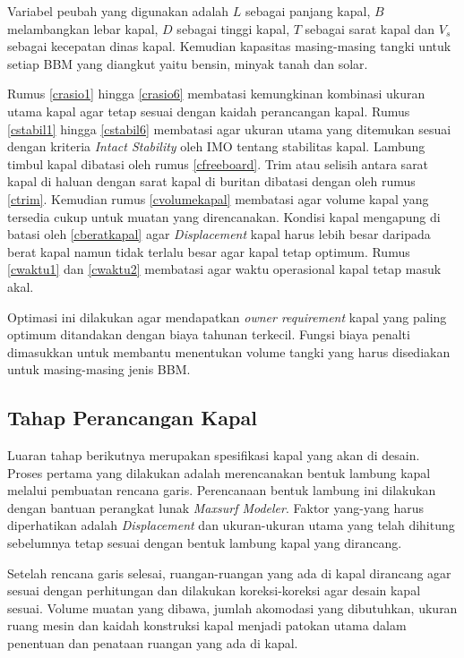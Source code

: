     Variabel peubah yang digunakan adalah $L$ sebagai panjang kapal, $B$ melambangkan lebar kapal, $D$ sebagai tinggi kapal, $T$ sebagai sarat kapal dan $V_s$ sebagai kecepatan dinas kapal. Kemudian kapasitas masing-masing tangki untuk setiap BBM yang diangkut yaitu bensin, minyak tanah dan solar.

    Rumus \ref{crasio1} hingga \ref{crasio6} membatasi kemungkinan kombinasi ukuran utama kapal agar tetap sesuai dengan kaidah perancangan kapal. Rumus \ref{cstabil1} hingga \ref{cstabil6} membatasi agar ukuran utama yang ditemukan sesuai dengan kriteria \emph{Intact Stability} oleh IMO tentang stabilitas kapal. Lambung timbul kapal dibatasi oleh rumus \ref{cfreeboard}. Trim atau selisih antara sarat kapal di haluan dengan sarat kapal di buritan dibatasi dengan oleh rumus \ref{ctrim}. Kemudian rumus \ref{cvolumekapal} membatasi agar volume kapal yang tersedia cukup untuk muatan yang direncanakan. Kondisi kapal mengapung di batasi oleh \ref{cberatkapal} agar \emph{Displacement} kapal harus lebih besar daripada berat kapal namun tidak terlalu besar agar kapal tetap optimum. Rumus \ref{cwaktu1} dan \ref{cwaktu2} membatasi agar waktu operasional kapal tetap masuk akal.

    Optimasi ini dilakukan agar mendapatkan \emph{owner requirement} kapal yang paling optimum ditandakan dengan biaya tahunan terkecil. Fungsi biaya penalti dimasukkan untuk membantu menentukan volume tangki yang harus disediakan untuk masing-masing jenis BBM.


\subsection{Tahap Perancangan Kapal}
\label{subsec:tahap-deskap}

    Luaran tahap berikutnya merupakan spesifikasi kapal yang akan di desain. Proses pertama yang dilakukan adalah merencanakan bentuk lambung kapal melalui pembuatan rencana garis. Perencanaan bentuk lambung ini dilakukan dengan bantuan perangkat lunak \emph{Maxsurf Modeler}. Faktor yang-yang harus diperhatikan adalah \emph{Displacement} dan ukuran-ukuran utama yang telah dihitung sebelumnya tetap sesuai dengan bentuk lambung kapal yang dirancang.

    Setelah rencana garis selesai, ruangan-ruangan yang ada di kapal dirancang agar sesuai dengan perhitungan dan dilakukan koreksi-koreksi agar desain kapal sesuai. Volume muatan yang dibawa, jumlah akomodasi yang dibutuhkan, ukuran ruang mesin dan kaidah konstruksi kapal menjadi patokan utama dalam penentuan dan penataan ruangan yang ada di kapal.

